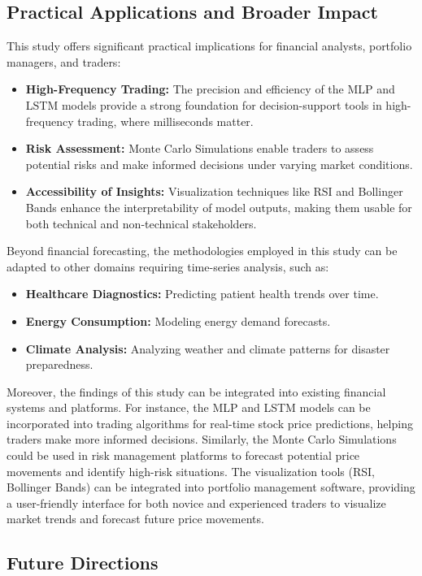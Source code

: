 \documentclass[conference]{IEEEtran}
\begin{document}
\subsection{Practical Applications and Broader Impact}

This study offers significant practical implications for financial analysts, portfolio managers, and traders: \begin{itemize} \item \textbf{High-Frequency Trading:} The precision and efficiency of the MLP and LSTM models provide a strong foundation for decision-support tools in high-frequency trading, where milliseconds matter. \item \textbf{Risk Assessment:} Monte Carlo Simulations enable traders to assess potential risks and make informed decisions under varying market conditions. \item \textbf{Accessibility of Insights:} Visualization techniques like RSI and Bollinger Bands enhance the interpretability of model outputs, making them usable for both technical and non-technical stakeholders. \end{itemize}

Beyond financial forecasting, the methodologies employed in this study can be adapted to other domains requiring time-series analysis, such as: \begin{itemize} \item \textbf{Healthcare Diagnostics:} Predicting patient health trends over time. \item \textbf{Energy Consumption:} Modeling energy demand forecasts. \item \textbf{Climate Analysis:} Analyzing weather and climate patterns for disaster preparedness. \end{itemize}

Moreover, the findings of this study can be integrated into existing financial systems and platforms. For instance, the MLP and LSTM models can be incorporated into trading algorithms for real-time stock price predictions, helping traders make more informed decisions. Similarly, the Monte Carlo Simulations could be used in risk management platforms to forecast potential price movements and identify high-risk situations. The visualization tools (RSI, Bollinger Bands) can be integrated into portfolio management software, providing a user-friendly interface for both novice and experienced traders to visualize market trends and forecast future price movements.

\subsection{Future Directions}
\end{document}
